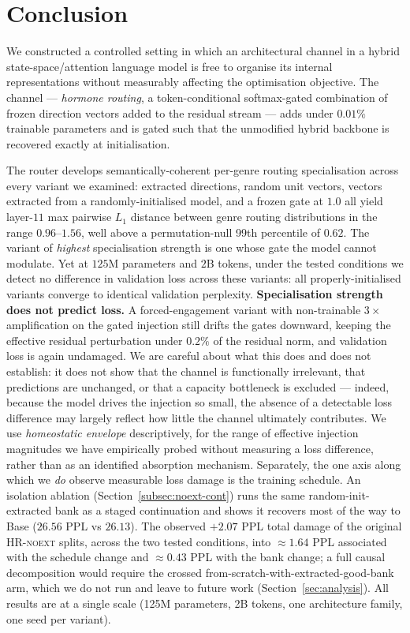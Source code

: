 \section{Conclusion}
\label{sec:conclusion}

We constructed a controlled setting in which an architectural channel in a hybrid state-space/attention language model is free to organise its internal representations without measurably affecting the optimisation objective. The channel --- \emph{hormone routing}, a token-conditional softmax-gated combination of frozen direction vectors added to the residual stream --- adds under $0.01\%$ trainable parameters and is gated such that the unmodified hybrid backbone is recovered exactly at initialisation.

The router develops semantically-coherent per-genre routing specialisation across every variant we examined: extracted directions, random unit vectors, vectors extracted from a randomly-initialised model, and a frozen gate at $1.0$ all yield layer-$11$ max pairwise $L_1$ distance between genre routing distributions in the range $0.96$--$1.56$, well above a permutation-null 99th percentile of $0.62$. The variant of \emph{highest} specialisation strength is one whose gate the model cannot modulate. Yet at $125$M parameters and $2$B tokens, under the tested conditions we detect no difference in validation loss across these variants: all properly-initialised variants converge to identical validation perplexity. \textbf{Specialisation strength does not predict loss.} A forced-engagement variant with non-trainable $3\times$ amplification on the gated injection still drifts the gates downward, keeping the effective residual perturbation under $0.2\%$ of the residual norm, and validation loss is again undamaged. We are careful about what this does and does not establish: it does not show that the channel is functionally irrelevant, that predictions are unchanged, or that a capacity bottleneck is excluded --- indeed, because the model drives the injection so small, the absence of a detectable loss difference may largely reflect how little the channel ultimately contributes. We use \emph{homeostatic envelope} descriptively, for the range of effective injection magnitudes we have empirically probed without measuring a loss difference, rather than as an identified absorption mechanism. Separately, the one axis along which we \emph{do} observe measurable loss damage is the training schedule. An isolation ablation (Section~\ref{subsec:noext-cont}) runs the same random-init-extracted bank as a staged continuation and shows it recovers most of the way to Base ($26.56$ PPL vs $26.13$). The observed $+2.07$ PPL total damage of the original \textsc{HR-noext} splits, across the two tested conditions, into $\approx 1.64$ PPL associated with the schedule change and $\approx 0.43$ PPL with the bank change; a full causal decomposition would require the crossed from-scratch-with-extracted-good-bank arm, which we do not run and leave to future work (Section~\ref{sec:analysis}). All results are at a single scale (125M parameters, 2B tokens, one architecture family, one seed per variant).

